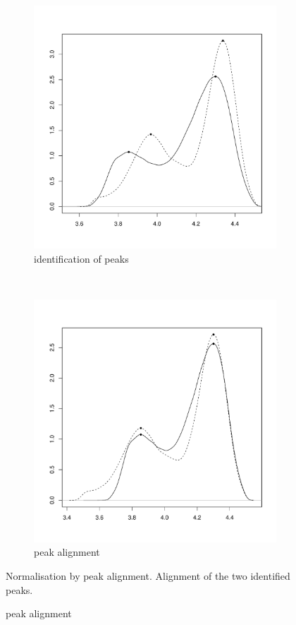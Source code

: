 \begin{figure}[ht]
\begin{subfigure}[b]{.5\textwidth}
\centering
\includegraphics[scale=.4]{figures/normalisation-peaks-a.pdf} 
\caption{identification of peaks}
\end{subfigure}
~
\begin{subfigure}[b]{.5\textwidth}
\centering
\includegraphics[scale=.4]{figures/normalisation-peaks-b.pdf} 
\caption{peak alignment}
\end{subfigure}
{Normalisation by peak alignment.}
{
Alignment of the two identified peaks.
}
\end{figure}


